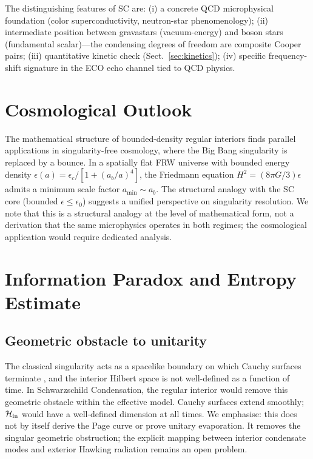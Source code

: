 \documentclass[epj]{svjour}
\begin{document}
The distinguishing features of SC are: (i) a concrete QCD microphysical foundation (color superconductivity, neutron-star phenomenology); (ii) intermediate position between gravastars (vacuum-energy) and boson stars (fundamental scalar)---the condensing degrees of freedom are composite Cooper pairs; (iii) quantitative kinetic check (Sect.~\ref{sec:kinetics}); (iv) specific frequency-shift signature in the ECO echo channel tied to QCD physics.

\section{Cosmological Outlook}
\label{sec:cosmology}

The mathematical structure of bounded-density regular interiors finds parallel applications in singularity-free cosmology, where the Big Bang singularity is replaced by a bounce. In a spatially flat FRW universe with bounded energy density $\epsilon(a) = \epsilon_c/[1 + (a_b/a)^4]$, the Friedmann equation $H^2 = (8\pi G/3)\epsilon$ admits a minimum scale factor $a_{\min} \sim a_b$. The structural analogy with the SC core (bounded $\epsilon \leq \epsilon_0$) suggests a unified perspective on singularity resolution. We note that this is a structural analogy at the level of mathematical form, not a derivation that the same microphysics operates in both regimes; the cosmological application would require dedicated analysis.

\section{Information Paradox and Entropy Estimate}
\label{sec:information}

\subsection{Geometric obstacle to unitarity}
\label{sec:geom_obstacle}

The classical singularity acts as a spacelike boundary on which Cauchy surfaces terminate \cite{Hawking1975,Preskill1992,Page1993}, and the interior Hilbert space is not well-defined as a function of time. In Schwarzschild Condensation, the regular interior would remove this geometric obstacle within the effective model. Cauchy surfaces extend smoothly; $\mathcal{H}_{\rm in}$ would have a well-defined dimension at all times. We emphasise: this does not by itself derive the Page curve or prove unitary evaporation. It removes the singular geometric obstruction; the explicit mapping between interior condensate modes and exterior Hawking radiation remains an open problem.
\end{document}

